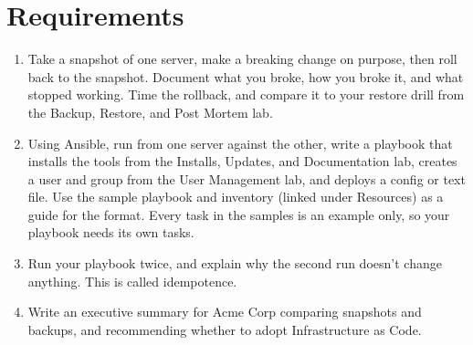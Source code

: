 \documentclass[12pt]{article}
\begin{document}
\section*{Requirements}
\begin{enumerate}
    \item Take a snapshot of one server, make a breaking change on purpose, then roll back to the snapshot. Document what you broke, how you broke it, and what stopped working. Time the rollback, and compare it to your restore drill from the Backup, Restore, and Post Mortem lab.
    \item Using Ansible, run from one server against the other, write a playbook that installs the tools from the Installs, Updates, and Documentation lab, creates a user and group from the User Management lab, and deploys a config or text file. Use the sample playbook and inventory (linked under Resources) as a guide for the format. Every task in the samples is an example only, so your playbook needs its own tasks.
    \item Run your playbook twice, and explain why the second run doesn't change anything. This is called idempotence.
    \item Write an executive summary for Acme Corp comparing snapshots and backups, and recommending whether to adopt Infrastructure as Code.
\end{enumerate}
\end{document}
